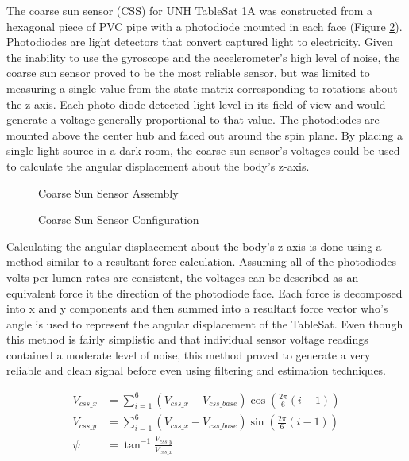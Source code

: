 The coarse sun sensor (CSS) for UNH TableSat 1A was constructed from a hexagonal piece of PVC pipe with a photodiode mounted in each face (Figure \ref{fig:CSS}).  Photodiodes are light detectors that convert captured light to electricity.  Given the inability to use the gyroscope and the accelerometer's high level of noise, the coarse sun sensor proved to be the most reliable sensor, but was limited to measuring a single value from the state matrix corresponding to rotations about the z-axis.  Each photo diode detected light level in its field of view and would generate a voltage generally proportional to that value.  The photodiodes are mounted above the center hub and faced out around the spin plane.  By placing a single light source in a dark room, the coarse sun sensor's voltages could be used to calculate the angular displacement about the body's z-axis.

\begin{figure}[ht]
  \centerline{}
  \caption{Coarse Sun Sensor Assembly}
  \label{fig:CoarseSunSensorAssembly}
\end{figure}

\begin{figure}[H]
  \centerline{}
  \caption{Coarse Sun Sensor Configuration}
  \label{fig:CSS}
\end{figure}

Calculating the angular displacement about the body's z-axis is done using a method similar to a resultant force calculation.  Assuming all of the photodiodes volts per lumen rates are consistent, the voltages can be described as an equivalent force it the direction of the photodiode face.  Each force is decomposed into x and y components and then summed into a resultant force vector who's angle is used to represent the angular displacement of the TableSat.  Even though this method is fairly simplistic and that individual sensor voltage readings contained a moderate level of noise, this method proved to generate a very reliable and clean signal before even using filtering and estimation techniques.

\begin{subequations}
  \begin{align}
    V_{css\_x} & = \sum\limits_{i=1}^6 (V_{css\_x} - V_{css\_base}) \cos \left( \frac{2\pi}{6} (i-1)\right) \\
    V_{css\_y} & = \sum\limits_{i=1}^6 (V_{css\_x} - V_{css\_base}) \sin \left( \frac{2\pi}{6} (i-1)\right) \\
    \psi & = \tan^{-1} \frac{V_{css\_y}}{V_{css\_x}}
  \end{align}
  \label{eqn:CSSResultantForce}
\end{subequations}

